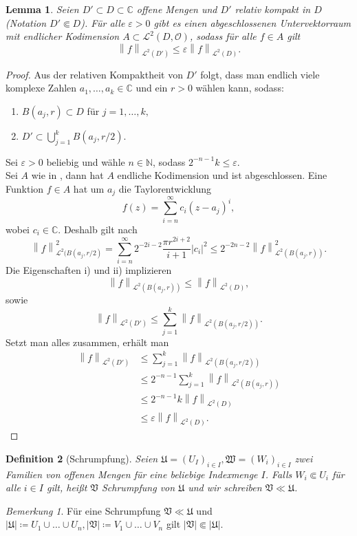 \documentclass[11pt,a4paper,toc=bibliography]{scrartcl}
\theoremstyle{def}
\newtheorem{defi}{Definition}[section]
\theoremstyle{thm}
\newtheorem{lemma}[defi]{Lemma}
\theoremstyle{remark}
\newtheorem*{bem}{Bemerkung}
\newcommand*{\norm}[1]{\left\lVert#1\right\rVert} %
\begin{document}
\begin{lemma}
Seien $D' \subset D\subset \mathbb{C}$ offene Mengen und $D'$ relativ kompakt in $D$ (Notation $D'\Subset D$). Für alle $\varepsilon >0$ gibt es einen abgeschlossenen Untervektorraum mit endlicher Kodimension $A\subset \mathcal{L}^2(D,\mathcal{O})$, sodass für alle $f\in A$ gilt
\[
\norm{f}_{\mathcal{L}^2(D')} \leq \varepsilon \norm{f}_{\mathcal{L}^2(D)}.
\]
\end{lemma}
\begin{proof}
Aus der relativen Kompaktheit von $D'$ folgt, dass man endlich viele komplexe Zahlen $a_1,\ldots,a_k\in\mathbb{C}$ und ein $r>0$ wählen kann, sodass:
\begin{enumerate}
\item $B(a_j,r)\subset D$ für $j=1,\ldots,k,$
\item  $D'\subset\bigcup_{j=1}^k B(a_j,r/2)$.
\end{enumerate}
Sei $\varepsilon>0$ beliebig und wähle $n\in\mathbb{N}$, sodass $2^{-n-1}k\leq\varepsilon$.\\
Sei $A$ wie in , dann hat $A$ endliche Kodimension und ist abgeschlossen. Eine Funktion $f\in A$ hat um $a_j$ die Taylorentwicklung 
\[
f(z)=\sum_{i=n}^{\infty} c_i(z-a_j)^i,
\]
wobei $c_i\in\mathbb{C}$. Deshalb gilt nach 
\[
\norm{f}_{\mathcal{L}^2(B(a_j,r/2)}^2=\sum_{i=n}^{\infty}2^{-2i-2}\frac{\pi r^{2i+2}}{i+1}|c_i|^2\leq 2^{-2n-2}\norm{f}_{\mathcal{L}^2(B(a_j,r))}^2.
\]
Die Eigenschaften i) und ii) implizieren
\[
\norm{f}_{\mathcal{L}^2(B(a_j,r))}\leq \norm{f}_{\mathcal{L}^2(D)},
\]
sowie
\[
\norm{f}_{\mathcal{L}^2(D')}\leq \sum_{j=1}^{k}\norm{f}_{\mathcal{L}^2(B(a_j,r/2))}.
\]
Setzt man alles zusammen, erhält man
\begin{align*}
    \norm{f}_{\mathcal{L}^2(D')} & \leq \sum_{j=1}^{k}\norm{f}_{\mathcal{L}^2(B(a_j,r/2))}\\
                                &\leq 2^{-n-1}\sum_{j=1}^{k}\norm{f}_{\mathcal{L}^2(B(a_j,r))}\\
                                &\leq 2^{-n-1}k \norm{f}_{\mathcal{L}^2(D)}\\
                                &\leq \varepsilon \norm{f}_{\mathcal{L}^2(D)}.
\end{align*}


\end{proof}
\begin{defi}[Schrumpfung]
Seien $\mathfrak{U}=(U_I)_{i\in I},\mathfrak{W}=(W_i)_{i\in I}$ zwei Familien von offenen Mengen für eine beliebige Indexmenge $I$. Falls $W_i\Subset U_i$ für alle $i\in I$ gilt, heißt $\mathfrak{V}$ \emph{Schrumpfung} von $\mathfrak{U}$ und wir schreiben $\mathfrak{V}\ll\mathfrak{U}$.
\end{defi}
\begin{bem}
    Für eine Schrumpfung $\mathfrak{V}\ll\mathfrak{U}$ und $|\mathfrak{U}|\coloneqq U_1\cup\ldots\cup U_n, |\mathfrak{V}|\coloneqq V_1\cup\ldots\cup V_n$ gilt $|\mathfrak{V}|\Subset |\mathfrak{U}|$.
\end{bem}
\end{document}
